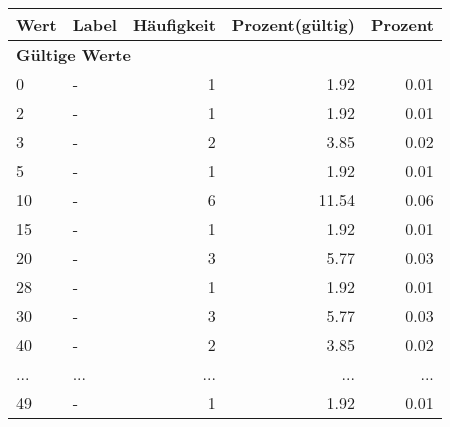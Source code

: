      \begin{longtable}{lXrrr}
     \toprule
     \textbf{Wert} & \textbf{Label} & \textbf{Häufigkeit} & \textbf{Prozent(gültig)} & \textbf{Prozent} \\
     \endhead
     \midrule
     \multicolumn{5}{l}{\textbf{Gültige Werte}}\\
        0 & \multicolumn{1}{X}{-} & %
          \num{1} &
          \num[round-mode=places,round-precision=2]{1.92} &
          \num[round-mode=places,round-precision=2]{0.01} \\
        2 & \multicolumn{1}{X}{-} & %
          \num{1} &
          \num[round-mode=places,round-precision=2]{1.92} &
          \num[round-mode=places,round-precision=2]{0.01} \\
        3 & \multicolumn{1}{X}{-} & %
          \num{2} &
          \num[round-mode=places,round-precision=2]{3.85} &
          \num[round-mode=places,round-precision=2]{0.02} \\
        5 & \multicolumn{1}{X}{-} & %
          \num{1} &
          \num[round-mode=places,round-precision=2]{1.92} &
          \num[round-mode=places,round-precision=2]{0.01} \\
        10 & \multicolumn{1}{X}{-} & %
          \num{6} &
          \num[round-mode=places,round-precision=2]{11.54} &
          \num[round-mode=places,round-precision=2]{0.06} \\
        15 & \multicolumn{1}{X}{-} & %
          \num{1} &
          \num[round-mode=places,round-precision=2]{1.92} &
          \num[round-mode=places,round-precision=2]{0.01} \\
        20 & \multicolumn{1}{X}{-} & %
          \num{3} &
          \num[round-mode=places,round-precision=2]{5.77} &
          \num[round-mode=places,round-precision=2]{0.03} \\
        28 & \multicolumn{1}{X}{-} & %
          \num{1} &
          \num[round-mode=places,round-precision=2]{1.92} &
          \num[round-mode=places,round-precision=2]{0.01} \\
        30 & \multicolumn{1}{X}{-} & %
          \num{3} &
          \num[round-mode=places,round-precision=2]{5.77} &
          \num[round-mode=places,round-precision=2]{0.03} \\
        40 & \multicolumn{1}{X}{-} & %
          \num{2} &
          \num[round-mode=places,round-precision=2]{3.85} &
          \num[round-mode=places,round-precision=2]{0.02} \\
       ... & ... & ... & ... & ... \\
        49 & \multicolumn{1}{X}{-} & %
          \num{1} &
          \num[round-mode=places,round-precision=2]{1.92} &
          \num[round-mode=places,round-precision=2]{0.01} \\


\end{longtable}
